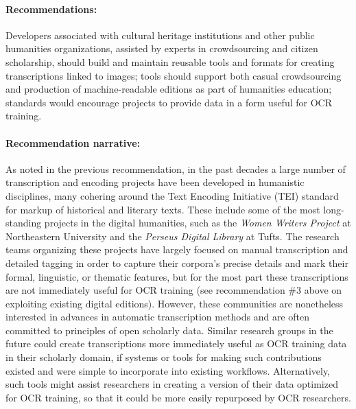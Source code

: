 \documentclass[twoside,11pt]{report}
\begin{document}
\paragraph{Recommendations:} Developers associated with cultural heritage institutions and other public humanities organizations, assisted by experts in crowdsourcing and citizen scholarship, should build and maintain reusable tools and formats for creating transcriptions linked to images; tools should support both casual crowdsourcing and production of machine-readable editions as part of humanities education; standards would encourage projects to provide data in a form useful for OCR training.

\paragraph{Recommendation narrative:}

As noted in the previous recommendation, in the past decades a large number of transcription and encoding projects have been developed in humanistic disciplines, many cohering around the Text Encoding Initiative (TEI) standard for markup of historical and literary texts. These include some of the most long-standing projects in the digital humanities, such as the \emph{Women Writers Project} at Northeastern University and the \emph{Perseus Digital Library} at Tufts. The research teams organizing these projects have largely focused on manual transcription and detailed tagging in order to capture their corpora's precise details and mark their formal, linguistic, or thematic features, but for the most part these transcriptions are not immediately useful for OCR training (see recommendation \#3 above on exploiting existing digital editions). However, these communities are nonetheless interested in advances in automatic transcription methods and are often committed to principles of open scholarly data. Similar research groups in the future could create transcriptions more immediately useful as OCR training data in their scholarly domain, if systems or tools for making such contributions existed and were simple to incorporate into existing workflows. Alternatively, such tools might assist researchers in creating a version of their data optimized for OCR training, so that it could be more easily repurposed by OCR researchers.
\end{document}

